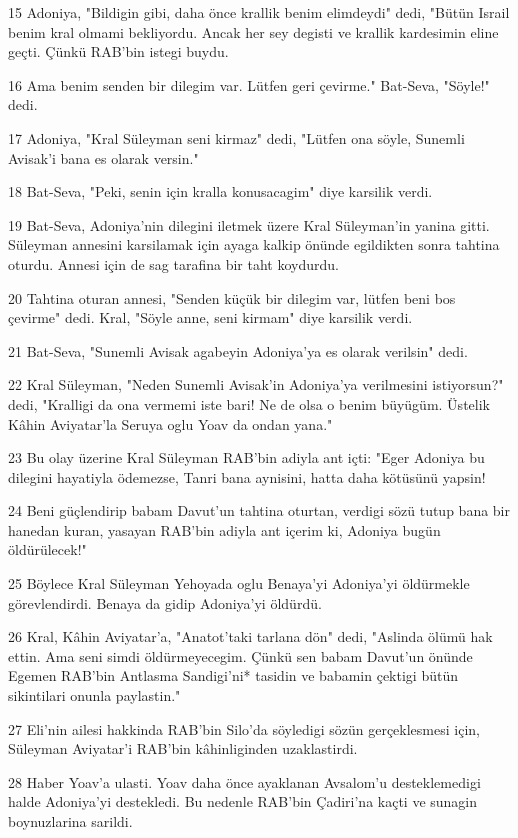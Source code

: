 \par 15 Adoniya, "Bildigin gibi, daha önce krallik benim elimdeydi" dedi, "Bütün Israil benim kral olmami bekliyordu. Ancak her sey degisti ve krallik kardesimin eline geçti. Çünkü RAB'bin istegi buydu.
\par 16 Ama benim senden bir dilegim var. Lütfen geri çevirme." Bat-Seva, "Söyle!" dedi.
\par 17 Adoniya, "Kral Süleyman seni kirmaz" dedi, "Lütfen ona söyle, Sunemli Avisak'i bana es olarak versin."
\par 18 Bat-Seva, "Peki, senin için kralla konusacagim" diye karsilik verdi.
\par 19 Bat-Seva, Adoniya'nin dilegini iletmek üzere Kral Süleyman'in yanina gitti. Süleyman annesini karsilamak için ayaga kalkip önünde egildikten sonra tahtina oturdu. Annesi için de sag tarafina bir taht koydurdu.
\par 20 Tahtina oturan annesi, "Senden küçük bir dilegim var, lütfen beni bos çevirme" dedi. Kral, "Söyle anne, seni kirmam" diye karsilik verdi.
\par 21 Bat-Seva, "Sunemli Avisak agabeyin Adoniya'ya es olarak verilsin" dedi.
\par 22 Kral Süleyman, "Neden Sunemli Avisak'in Adoniya'ya verilmesini istiyorsun?" dedi, "Kralligi da ona vermemi iste bari! Ne de olsa o benim büyügüm. Üstelik Kâhin Aviyatar'la Seruya oglu Yoav da ondan yana."
\par 23 Bu olay üzerine Kral Süleyman RAB'bin adiyla ant içti: "Eger Adoniya bu dilegini hayatiyla ödemezse, Tanri bana aynisini, hatta daha kötüsünü yapsin!
\par 24 Beni güçlendirip babam Davut'un tahtina oturtan, verdigi sözü tutup bana bir hanedan kuran, yasayan RAB'bin adiyla ant içerim ki, Adoniya bugün öldürülecek!"
\par 25 Böylece Kral Süleyman Yehoyada oglu Benaya'yi Adoniya'yi öldürmekle görevlendirdi. Benaya da gidip Adoniya'yi öldürdü.
\par 26 Kral, Kâhin Aviyatar'a, "Anatot'taki tarlana dön" dedi, "Aslinda ölümü hak ettin. Ama seni simdi öldürmeyecegim. Çünkü sen babam Davut'un önünde Egemen RAB'bin Antlasma Sandigi'ni* tasidin ve babamin çektigi bütün sikintilari onunla paylastin."
\par 27 Eli'nin ailesi hakkinda RAB'bin Silo'da söyledigi sözün gerçeklesmesi için, Süleyman Aviyatar'i RAB'bin kâhinliginden uzaklastirdi.
\par 28 Haber Yoav'a ulasti. Yoav daha önce ayaklanan Avsalom'u desteklemedigi halde Adoniya'yi destekledi. Bu nedenle RAB'bin Çadiri'na kaçti ve sunagin boynuzlarina sarildi.
